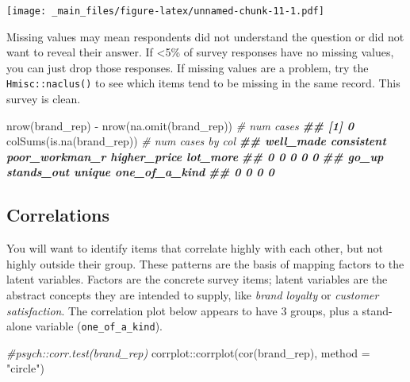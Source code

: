 \documentclass[
]{book}
\newenvironment{Shaded}{\begin{snugshade}}{\end{snugshade}}
\newcommand{\AttributeTok}[1]{\textcolor[rgb]{0.77,0.63,0.00}{#1}}
\newcommand{\CommentTok}[1]{\textcolor[rgb]{0.56,0.35,0.01}{\textit{#1}}}
\newcommand{\DocumentationTok}[1]{\textcolor[rgb]{0.56,0.35,0.01}{\textbf{\textit{#1}}}}
\newcommand{\FunctionTok}[1]{\textcolor[rgb]{0.00,0.00,0.00}{#1}}
\newcommand{\NormalTok}[1]{#1}
\newcommand{\SpecialCharTok}[1]{\textcolor[rgb]{0.00,0.00,0.00}{#1}}
\newcommand{\StringTok}[1]{\textcolor[rgb]{0.31,0.60,0.02}{#1}}
\theoremstyle{definition}
\theoremstyle{definition}
\theoremstyle{definition}
\theoremstyle{definition}
\theoremstyle{remark}
\begin{document}
\texttt{[image: \_main\_files/figure-latex/unnamed-chunk-11-1.pdf]}

Missing values may mean respondents did not understand the question or did not want to reveal their answer. If \textless5\% of survey responses have no missing values, you can just drop those responses. If missing values are a problem, try the \texttt{Hmisc::naclus()} to see which items tend to be missing in the same record. This survey is clean.

\begin{Shaded}
\begin{Highlighting}[]
\FunctionTok{nrow}\NormalTok{(brand\_rep) }\SpecialCharTok{{-}} \FunctionTok{nrow}\NormalTok{(}\FunctionTok{na.omit}\NormalTok{(brand\_rep)) }\CommentTok{\# num cases}
\DocumentationTok{\#\# [1] 0}
\FunctionTok{colSums}\NormalTok{(}\FunctionTok{is.na}\NormalTok{(brand\_rep)) }\CommentTok{\# num cases by col}
\DocumentationTok{\#\#      well\_made     consistent poor\_workman\_r   higher\_price       lot\_more }
\DocumentationTok{\#\#              0              0              0              0              0 }
\DocumentationTok{\#\#          go\_up     stands\_out         unique  one\_of\_a\_kind }
\DocumentationTok{\#\#              0              0              0              0}
\end{Highlighting}
\end{Shaded}

\hypertarget{correlations}{%
\subsection{Correlations}\label{correlations}}

You will want to identify items that correlate highly with each other, but not highly outside their group. These patterns are the basis of mapping factors to the latent variables. Factors are the concrete survey items; latent variables are the abstract concepts they are intended to supply, like \emph{brand loyalty} or \emph{customer satisfaction}. The correlation plot below appears to have 3 groups, plus a stand-alone variable (\texttt{one\_of\_a\_kind}).

\begin{Shaded}
\begin{Highlighting}[]
\CommentTok{\#psych::corr.test(brand\_rep)}
\NormalTok{corrplot}\SpecialCharTok{::}\FunctionTok{corrplot}\NormalTok{(}\FunctionTok{cor}\NormalTok{(brand\_rep), }\AttributeTok{method =} \StringTok{"circle"}\NormalTok{)}
\end{Highlighting}
\end{Shaded}
\end{document}
